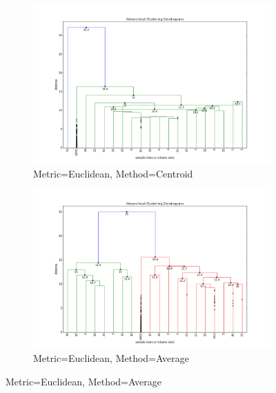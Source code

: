 \begin{figure}[H]
\medskip
\begin{subfigure}{0.48\textwidth}
\includegraphics[width=\linewidth]{figs/Dendrogram/dendrogram-centroid}
\caption{Metric=Euclidean, Method=Centroid} \label{fig:Dendrogram_all_single_c}
\end{subfigure}\hspace*{\fill}
\begin{subfigure}{0.48\textwidth}
\includegraphics[width=\linewidth]{figs/Dendrogram/dendrogram-average}
\caption{Metric=Euclidean, Method=Average} \label{fig:Dendrogram_all_single_d}
\end{subfigure}


\end{figure}
